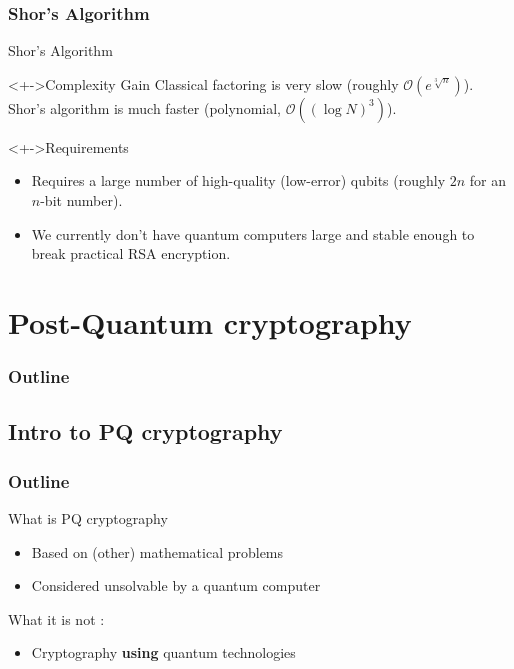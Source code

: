 \documentclass{beamer}
\begin{document}
\subsubsection*{Shor's Algorithm}
\begin{frame}{Shor's Algorithm}
\begin{linenumbers}
  \begin{block}<+->{Complexity Gain}
        Classical factoring is very slow (roughly $\mathcal{O}(e^{\sqrt[3]{n}})$). Shor's algorithm is much faster (polynomial, $\mathcal{O}((\log N)^3)$).
  \end{block}
    \begin{block}<+->{Requirements}
        \begin{itemize}[<+->]
            \item Requires a large number of high-quality (low-error) qubits (roughly $2n$ for an $n$-bit number).
            \item  We currently don't have quantum computers large and stable enough to break practical RSA encryption.
        \end{itemize}
    \end{block}
\end{linenumbers}
\end{frame}

\section{Post-Quantum cryptography}
\begin{frame}
  \frametitle{Outline}
  \tableofcontents[currentsection]
\end{frame}

\subsection{Intro to PQ cryptography}
\begin{frame}
  \frametitle{Outline}
\end{frame}

\begin{frame}{What is PQ cryptography}
\begin{linenumbers}
	\begin{itemize}
		\item Based on (other) mathematical problems
		\item Considered unsolvable by a quantum computer
	\end{itemize}

	What it is not :
	\begin{itemize}
		\item Cryptography \textbf{using} quantum technologies
	\end{itemize}
\end{linenumbers}
\end{frame}
\end{document}
